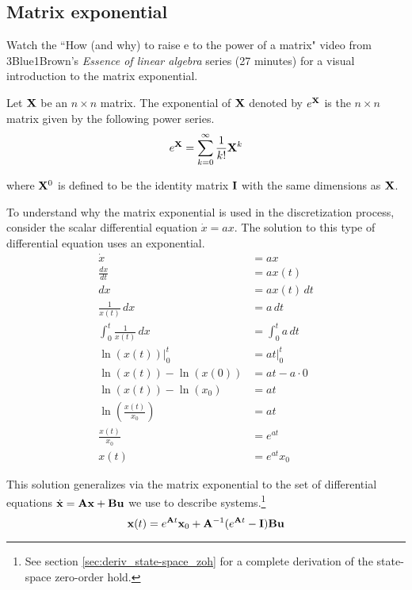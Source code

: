 \subsection{Matrix exponential}
\begin{remark}
  Watch the ``How (and why) to raise e to the power of a matrix" video from
  3Blue1Brown's \textit{Essence of linear algebra} series (27 minutes)
  \cite{bib:3b1b_linalg_matrix_exp} for a visual introduction to the matrix
  exponential.
\end{remark}
\begin{definition}
  Let $\mathbf{X}$ be an $n \times n$ matrix. The exponential of $\mathbf{X}$ denoted
  by $e^{\mathbf{X}}$ is the $n \times n$ matrix given by the following power
  series.
  \begin{equation}
    e^{\mathbf{X}} = \sum_{k=0}^\infty \frac{1}{k!} \mathbf{X}^k \label{eq:mat_exp}
  \end{equation}

  where $\mathbf{X}^0$ is defined to be the identity matrix $\mathbf{I}$ with the same
  dimensions as $\mathbf{X}$.
\end{definition}

To understand why the matrix exponential is used in the \gls{discretization}
process, consider the scalar differential equation $\dot{x} = ax$. The solution
to this type of differential equation uses an exponential.
\begin{align*}
  \dot{x} &= ax \\
  \frac{dx}{dt} &= ax(t) \\
  dx &= ax(t) \,dt \\
  \frac{1}{x(t)} \,dx &= a \,dt \\
  \int_0^t \frac{1}{x(t)} \,dx &= \int_0^t a \,dt \\
  \ln(x(t)) \rvert_0^t &= at \rvert_0^t \\
  \ln(x(t)) - \ln(x(0)) &= at - a \cdot 0 \\
  \ln(x(t)) - \ln(x_0) &= at \\
  \ln\left(\frac{x(t)}{x_0}\right) &= at \\
  \frac{x(t)}{x_0} &= e^{at} \\
  x(t) &= e^{at} x_0
\end{align*}

This solution generalizes via the matrix exponential to the set of differential
equations $\dot{\mathbf{x}} = \mathbf{A}\mathbf{x} + \mathbf{B}\mathbf{u}$ we use to describe
\glspl{system}.\footnote{See section \ref{sec:deriv_state-space_zoh} for a
complete derivation of the state-space zero-order hold.}
\begin{equation*}
  \mathbf{x}(t) = e^{\mathbf{A}t} \mathbf{x}_0 +
    \mathbf{A}^{-1}(e^{\mathbf{A}t} - \mathbf{I})\mathbf{B} \mathbf{u}
\end{equation*}

